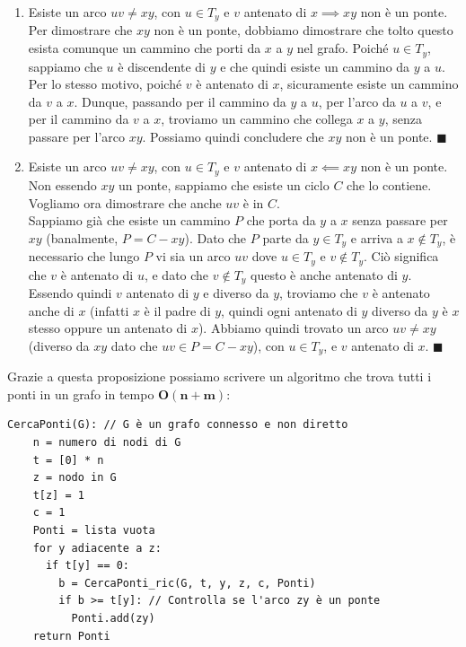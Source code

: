 \documentclass[11pt, a4paper, titlepage, oneside]{scrbook}
\begin{document}
\begin{enumerate}[label=\arabic*°]
    \item Esiste un arco $uv \neq xy$, con $u \in T_y$ e $v$ antenato di $x \implies xy$ non è un ponte.  \\
    Per dimostrare che $xy$ non è un ponte, dobbiamo dimostrare che tolto questo esista comunque un cammino che porti da $x$ a $y$ nel grafo. Poiché $u \in T_y$, sappiamo che $u$ è discendente di $y$ e che quindi esiste un cammino da $y$ a $u$. Per lo stesso motivo, poiché $v$ è antenato di $x$, sicuramente esiste un cammino da $v$ a $x$. Dunque, passando per il cammino da $y$ a $u$, per l'arco da $u$ a $v$, e per il cammino da $v$ a $x$, troviamo un cammino che collega $x$ a $y$, senza passare per l'arco $xy$. Possiamo quindi concludere che $xy$ non è un ponte. $\blacksquare$
    \item Esiste un arco $uv \neq xy$, con $u \in T_y$ e $v$ antenato di $x \impliedby xy$ non è un ponte.  \\
    Non essendo $xy$ un ponte, sappiamo che esiste un ciclo $C$ che lo contiene. Vogliamo ora dimostrare che anche $uv$ è in $C$. \\
    Sappiamo già che esiste un cammino $P$ che porta da $y$ a $x$ senza passare per $xy$ (banalmente, $P = C - xy$). Dato che $P$ parte da $y \in T_y$ e arriva a $x \notin T_y$, è necessario che lungo $P$ vi sia un arco $uv$ dove $u \in T_y$ e $v \notin T_y$. Ciò significa che $v$ è antenato di $u$, e dato che $v \notin T_y$ questo è anche antenato di $y$. Essendo quindi $v$ antenato di $y$ e diverso da $y$, troviamo che $v$ è antenato anche di $x$ (infatti $x$ è il padre di $y$, quindi ogni antenato di $y$ diverso da $y$ è $x$ stesso oppure un antenato di $x$). Abbiamo quindi trovato un arco $uv \neq xy$ (diverso da $xy$ dato che $uv \in P = C - xy$), con $u \in T_y$, e $v$ antenato di $x$. $\blacksquare$
\end{enumerate}

Grazie a questa proposizione possiamo scrivere un algoritmo che trova tutti i ponti in un grafo in tempo $\textbf{O}\bm{(n+m)}$:

\begin{lstlisting}[style=Python]
CercaPonti(G): // G è un grafo connesso e non diretto
    n = numero di nodi di G
    t = [0] * n
    z = nodo in G
    t[z] = 1
    c = 1
    Ponti = lista vuota 
    for y adiacente a z:
      if t[y] == 0:
        b = CercaPonti_ric(G, t, y, z, c, Ponti)
        if b >= t[y]: // Controlla se l'arco zy è un ponte
          Ponti.add(zy) 
    return Ponti
\end{lstlisting}
\end{document}
